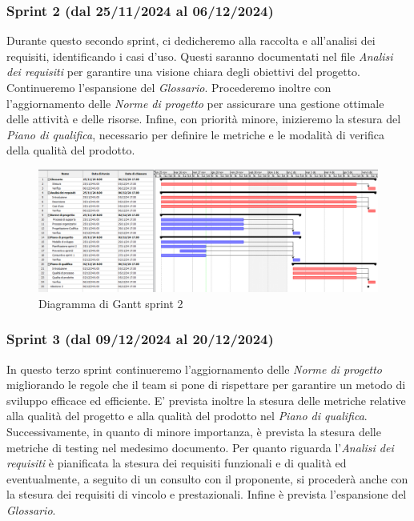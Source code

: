         \subsubsection{Sprint 2 (dal 25/11/2024 al 06/12/2024)}
        Durante questo secondo sprint, ci dedicheremo alla raccolta e all'analisi dei requisiti, identificando i 
        casi d'uso. Questi saranno documentati nel file \textit{Analisi dei requisiti} per garantire una visione 
        chiara degli obiettivi del progetto. Continueremo l'espansione del \textit{Glossario}. Procederemo inoltre con l'aggiornamento delle \textit{Norme di progetto} per assicurare una gestione ottimale delle attività e delle risorse. 
        Infine, con priorità minore, inizieremo la stesura del \textit{Piano di qualifica}, necessario per definire le metriche e le modalità di 
        verifica della qualità del prodotto.

        
        \begin{figure}[h!]
            \centering
            \includegraphics[scale = 0.3]{template/images/gantt2.png}
            \caption{Diagramma di Gantt sprint 2}
            \label{fig:3.2} %
        \end{figure}


        \subsubsection{Sprint 3 (dal 09/12/2024 al 20/12/2024)}
        In questo terzo sprint continueremo l'aggiornamento delle \textit{Norme di progetto} migliorando le regole che il team si pone di rispettare per garantire un metodo di sviluppo efficace ed efficiente. 
        E' prevista inoltre la stesura delle metriche relative alla qualità del progetto e alla qualità del prodotto nel \textit{Piano di qualifica}.
        Successivamente, in quanto di minore importanza, è prevista la stesura delle metriche di testing nel medesimo documento.
        Per quanto riguarda l'\textit{Analisi dei requisiti} è pianificata la stesura dei requisiti funzionali e di qualità ed eventualmente, a seguito di un consulto con il proponente, si procederà anche con la stesura dei requisiti di vincolo e prestazionali.
        Infine è prevista l'espansione del \textit{Glossario}.

